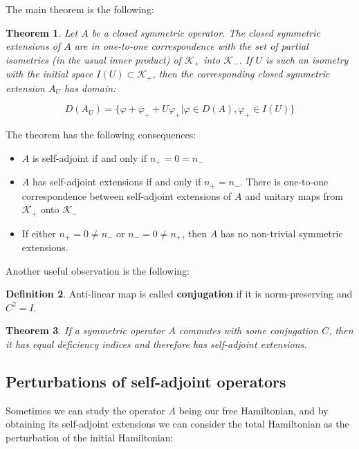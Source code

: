 \documentclass[11pt, a4paper, german]{article}
\theoremstyle{plain}
\newtheorem{theorem}{Theorem}
\theoremstyle{definition}
\newtheorem{definition}[theorem]{Definition}
\theoremstyle{remark}
\numberwithin{equation}{section}
\numberwithin{theorem}{section}
\begin{document}
The main theorem is the following:

\begin{theorem}
Let $A$ be a closed  symmetric operator. The closed symmetric extensions of $A$ are in one-to-one correspondence with the set of partial isometries (in the usual inner product) of $\mathcal{K}_+$ into $\mathcal{K}_-$. If $U$ is such an isometry with the initial space $I(U) \subset \mathcal{K} _+$, then the corresponding closed symmetric extension $A_U$ has domain:

\begin{equation}
D(A_U)=\{\varphi + \varphi_+ + U \varphi_+ | \varphi \in D(A), \varphi_+ \in I(U)\}
\end{equation}

\end{theorem}

The theorem has the following consequences:

\begin{itemize}
\item $A$ is self-adjoint if and only if $n_+ = 0 = n_-$
\item $A$ has self-adjoint extensions if and only if $n_+ = n_-$. There is one-to-one correspondence between self-adjoint extensions of $A$ and unitary maps from $\mathcal{K}_+$ onto $\mathcal{K}_-$
\item If either $n_+ = 0 \neq n_-$ or $n_- = 0 \neq n_+$, then $A$ has no non-trivial symmetric extensions.
\end{itemize}

Another useful observation is the following:    

\begin{definition}
Anti-linear map is called \textbf{conjugation} if it is norm-preserving and $C^2 = I$.
\end{definition}

\begin{theorem}
If a symmetric operator $A$ commutes with some conjugation $C$, then it has equal deficiency indices and therefore has self-adjoint extensions.
\end{theorem}

\subsection{Perturbations of self-adjoint operators}

Sometimes we can study the operator $A$ being our free Hamiltonian, and by obtaining its self-adjoint extensions we can consider the total Hamiltonian as the perturbation of the initial Hamiltonian:
\end{document}

